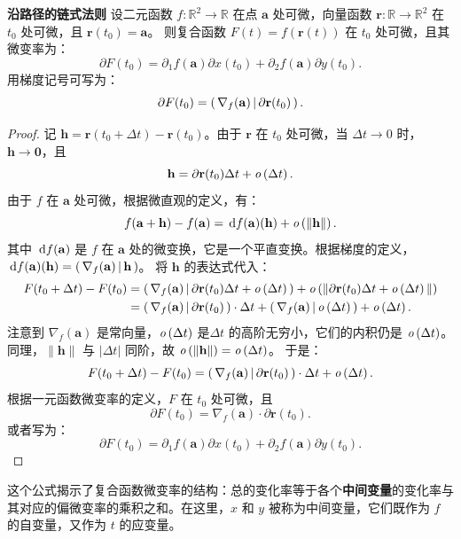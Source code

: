 \documentclass[12pt,UTF8]{ctexbook}
\begin{document}
\begin{tm}{\textbf{沿路径的链式法则}}
设二元函数 $f: \mathbb{R}^2 \to \mathbb{R}$ 在点 $\mathbf{a}$ 处可微，向量函数 $\mathbf{r}: \mathbb{R} \to \mathbb{R}^2$ 在 $t_0$ 处可微，且 $\mathbf{r}(t_0) = \mathbf{a}$。
则复合函数 $F(t) = f(\mathbf{r}(t))$ 在 $t_0$ 处可微，且其微变率为：
$$ \partial F(t_0) = \partial_1 f(\mathbf{a}) \partial x(t_0) + \partial_2 f(\mathbf{a}) \partial y(t_0). $$
用梯度记号可写为：
$$ \partial F(t_0) = \displaystyle\left( \,\nabla_f(\mathbf{a}) \,\middle\vert \,\partial \mathbf{r}(t_0) \,\right). $$
\end{tm}
\begin{proof}
记 $\mathbf{h} = \mathbf{r}(t_0 + \Delta t) - \mathbf{r}(t_0)$。由于 $\mathbf{r}$ 在 $t_0$ 处可微，当 $\Delta t \to 0$ 时，$\mathbf{h} \to \mathbf{0}$，且
$$ \mathbf{h} = \partial \mathbf{r}(t_0) \Delta t + \mathit{o}\left(\Delta t\right). $$
由于 $f$ 在 $\mathbf{a}$ 处可微，根据微直观的定义，有：
$$ f(\mathbf{a} + \mathbf{h}) - f(\mathbf{a}) = \,\mathrm{d} f(\mathbf{a})(\mathbf{h}) + \mathit{o}\left(\|\mathbf{h}\|\right). $$
其中 $\,\mathrm{d} f(\mathbf{a})$ 是 $f$ 在 $\mathbf{a}$ 处的微变换，它是一个平直变换。根据梯度的定义，$\,\mathrm{d} f(\mathbf{a})(\mathbf{h}) = \displaystyle\left( \,\nabla_f(\mathbf{a}) \,\middle\vert \,\mathbf{h} \,\right)$。
将 $\mathbf{h}$ 的表达式代入：
\begin{align*}
F(t_0 + \Delta t) - F(t_0) &= \displaystyle\left( \,\nabla_f(\mathbf{a}) \,\middle\vert \,\partial \mathbf{r}(t_0) \Delta t + \mathit{o}\left(\Delta t\right) \,\right) + \mathit{o}\left(\|\partial \mathbf{r}(t_0) \Delta t + \mathit{o}\left(\Delta t\right)\|\right) \\
&= \displaystyle\left( \,\nabla_f(\mathbf{a}) \,\middle\vert \,\partial \mathbf{r}(t_0) \,\right)\cdot \Delta t +  \displaystyle\left( \,\nabla_f(\mathbf{a}) \,\middle\vert \, \mathit{o}\left(\Delta t\right) \,\right) + \mathit{o}\left(\Delta t\right).
\end{align*}
注意到 $\nabla_f(\mathbf{a})$ 是常向量，$\mathit{o}\left(\Delta t\right)$ 是$\Delta t$ 的高阶无穷小，它们的内积仍是 $\mathit{o}\left(\Delta t\right)$。同理，$\|\mathbf{h}\|$ 与 $|\Delta t|$ 同阶，故 $\mathit{o}\left(\|\mathbf{h}\|\right) = \mathit{o}\left(\Delta t\right)$。
于是：
$$ F(t_0 + \Delta t) - F(t_0) = \displaystyle\left( \,\nabla_f(\mathbf{a}) \,\middle\vert \,\partial \mathbf{r}(t_0) \,\right)\cdot \Delta t + \mathit{o}\left(\Delta t\right). $$
根据一元函数微变率的定义，$F$ 在 $t_0$ 处可微，且
$$ \partial F(t_0) = \nabla_f(\mathbf{a}) \cdot \partial \mathbf{r}(t_0). $$
或者写为：
$$ \partial F(t_0) = \partial_1 f(\mathbf{a}) \partial x(t_0) + \partial_2 f(\mathbf{a}) \partial y(t_0). $$
\end{proof}

这个公式揭示了复合函数微变率的结构：总的变化率等于各个\textbf{中间变量}的变化率与其对应的偏微变率的乘积之和。在这里，$x$ 和 $y$ 被称为中间变量，它们既作为 $f$ 的自变量，又作为 $t$ 的应变量。

\end{document}
